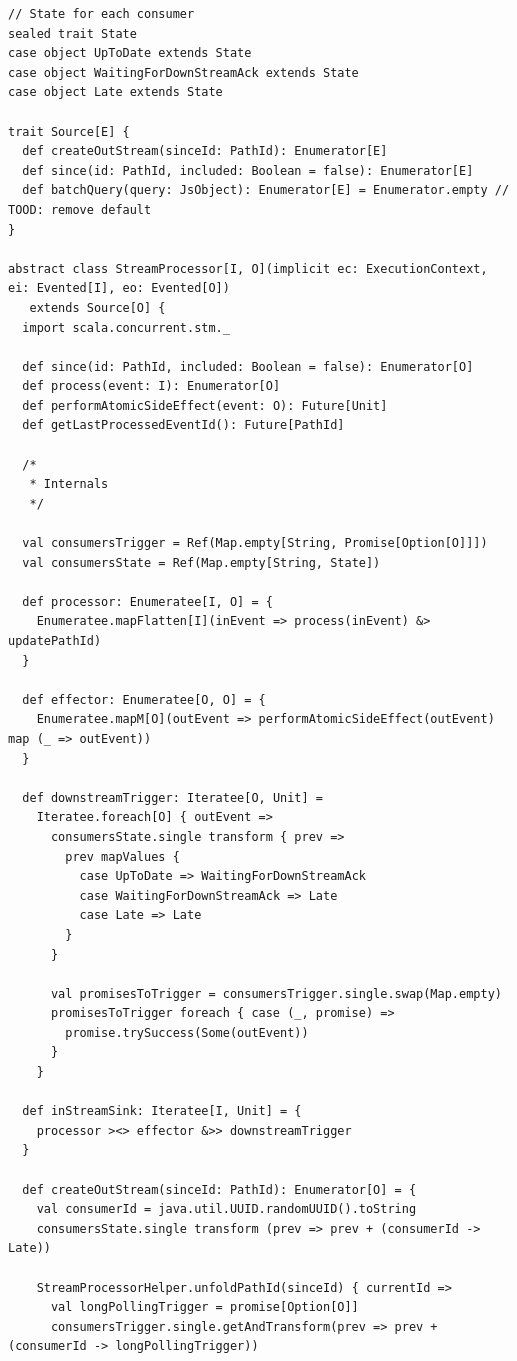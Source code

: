\begin{verbatim}
// State for each consumer
sealed trait State
case object UpToDate extends State
case object WaitingForDownStreamAck extends State
case object Late extends State

trait Source[E] {
  def createOutStream(sinceId: PathId): Enumerator[E]
  def since(id: PathId, included: Boolean = false): Enumerator[E]
  def batchQuery(query: JsObject): Enumerator[E] = Enumerator.empty // TOOD: remove default
}

abstract class StreamProcessor[I, O](implicit ec: ExecutionContext, ei: Evented[I], eo: Evented[O])
   extends Source[O] {
  import scala.concurrent.stm._
  
  def since(id: PathId, included: Boolean = false): Enumerator[O]
  def process(event: I): Enumerator[O]
  def performAtomicSideEffect(event: O): Future[Unit]
  def getLastProcessedEventId(): Future[PathId]
  
  /*
   * Internals
   */

  val consumersTrigger = Ref(Map.empty[String, Promise[Option[O]]])
  val consumersState = Ref(Map.empty[String, State])

  def processor: Enumeratee[I, O] = {
    Enumeratee.mapFlatten[I](inEvent => process(inEvent) &> updatePathId)
  }

  def effector: Enumeratee[O, O] = {
    Enumeratee.mapM[O](outEvent => performAtomicSideEffect(outEvent) map (_ => outEvent))
  }

  def downstreamTrigger: Iteratee[O, Unit] =
    Iteratee.foreach[O] { outEvent =>
      consumersState.single transform { prev =>
        prev mapValues {
          case UpToDate => WaitingForDownStreamAck
          case WaitingForDownStreamAck => Late
          case Late => Late
        }
      }

      val promisesToTrigger = consumersTrigger.single.swap(Map.empty)
      promisesToTrigger foreach { case (_, promise) =>
        promise.trySuccess(Some(outEvent))
      }
    }

  def inStreamSink: Iteratee[I, Unit] = {
    processor ><> effector &>> downstreamTrigger
  }

  def createOutStream(sinceId: PathId): Enumerator[O] = {
    val consumerId = java.util.UUID.randomUUID().toString
    consumersState.single transform (prev => prev + (consumerId -> Late))

    StreamProcessorHelper.unfoldPathId(sinceId) { currentId =>
      val longPollingTrigger = promise[Option[O]]
      consumersTrigger.single.getAndTransform(prev => prev + (consumerId -> longPollingTrigger))


\end{verbatim}
